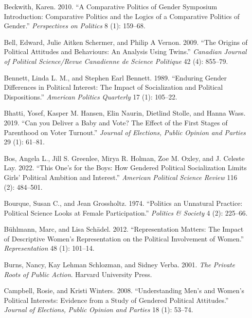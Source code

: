 \documentclass[
  letterpaper,
  DIV=11,
  numbers=noendperiod]{scrreprt}
\newlength{\cslhangindent}
\newlength{\cslentryspacingunit} %
\newenvironment{CSLReferences}[2] %
 {%
  \setlength{\parindent}{0pt}
  \ifodd #1
  \let\oldpar\par
  \def\par{\hangindent=\cslhangindent\oldpar}
  \fi
  \setlength{\parskip}{#2\cslentryspacingunit}
 }%
 {}
\begin{document}
\begin{CSLReferences}{1}{0}
\leavevmode{}%
Beckwith, Karen. 2010. {``{A Comparative Politics of Gender Symposium
Introduction: Comparative Politics and the Logics of a Comparative
Politics of Gender}.''} \emph{Perspectives on Politics} 8 (1): 159--68.

\leavevmode{}%
Bell, Edward, Julie Aitken Schermer, and Philip A Vernon. 2009. {``{The
Origins of Political Attitudes and Behaviours: An Analysis Using
Twins}.''} \emph{Canadian Journal of Political Science/Revue Canadienne
de Science Politique} 42 (4): 855--79.

\leavevmode{}%
Bennett, Linda L. M., and Stephen Earl Bennett. 1989. {``{Enduring
Gender Differences in Political Interest: The Impact of Socialization
and Political Dispositions}.''} \emph{American Politics Quarterly} 17
(1): 105--22.

\leavevmode{}%
Bhatti, Yosef, Kasper M. Hansen, Elin Naurin, Dietlind Stolle, and Hanna
Wass. 2019. {``{Can you Deliver a Baby and Vote? The Effect of the First
Stages of Parenthood on Voter Turnout}.''} \emph{Journal of Elections,
Public Opinion and Parties} 29 (1): 61--81.

\leavevmode{}%
Bos, Angela L., Jill S. Greenlee, Mirya R. Holman, Zoe M. Oxley, and J.
Celeste Lay. 2022. {``This One's for the Boys: How Gendered Political
Socialization Limits Girls' Political Ambition and Interest.''}
\emph{American Political Science Review} 116 (2): 484--501.

\leavevmode{}%
Bourque, Susan C., and Jean Grossholtz. 1974. {``{Politics an Unnatural
Practice: Political Science Looks at Female Participation}.''}
\emph{Politics \& Society} 4 (2): 225--66.

\leavevmode{}%
Bühlmann, Marc, and Lisa Schädel. 2012. {``{Representation Matters: The
Impact of Descriptive Women's Representation on the Political
Involvement of Women}.''} \emph{Representation} 48 (1): 101--14.

\leavevmode{}%
Burns, Nancy, Kay Lehman Schlozman, and Sidney Verba. 2001. \emph{{The
Private Roots of Public Action}}. Harvard University Press.

\leavevmode{}%
Campbell, Rosie, and Kristi Winters. 2008. {``{Understanding Men's and
Women's Political Interests: Evidence from a Study of Gendered Political
Attitudes}.''} \emph{Journal of Elections, Public Opinion and Parties}
18 (1): 53--74.


\end{CSLReferences}
\end{document}
